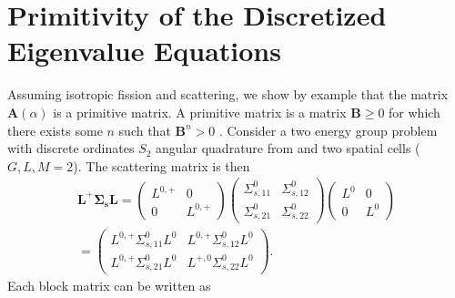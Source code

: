 \section{Primitivity of the Discretized Eigenvalue Equations}

Assuming isotropic fission and scattering, we show by example that the matrix $\mathbf{A}(\alpha)$ is a primitive matrix. A primitive matrix is a matrix $\mathbf{B} \geq 0$ for which there exists some $n$ such that $\mathbf{B}^{n} > 0$ \cite{horn_matrix_2012}.  Consider a two energy group problem with discrete ordinates $S_{2}$ angular quadrature from \cite{lewis_computational_1984} and two spatial cells ($G, L, M = 2$). The scattering matrix is then
\begin{multline*}
	\mathbf{L}^{+}  \mathbf{\Sigma_{s}} \mathbf{L} = \begin{pmatrix}
											L^{0,+} & 0 \\
											0 & L^{0,+}
										     \end{pmatrix}
										     \begin{pmatrix}
											\Sigma_{s,11}^{0} & \Sigma_{s,12}^{0} \\
											\Sigma_{s,21}^{0} & \Sigma_{s,22}^{0}
										     \end{pmatrix}
										     \begin{pmatrix}
											L^{0} & 0 \\
											0 & L^{0}
										     \end{pmatrix} \\= 
											\begin{pmatrix}
											L^{0,+}\Sigma_{s,11}^{0}L^{0} & L^{0,+}\Sigma_{s,12}^{0}L^{0} \\
											L^{0,+}\Sigma_{s,21}^{0}L^{0} & L^{+,0}\Sigma_{s,22}^{0}L^{0}
										     \end{pmatrix}.
\end{multline*}
Each block matrix can be written as
